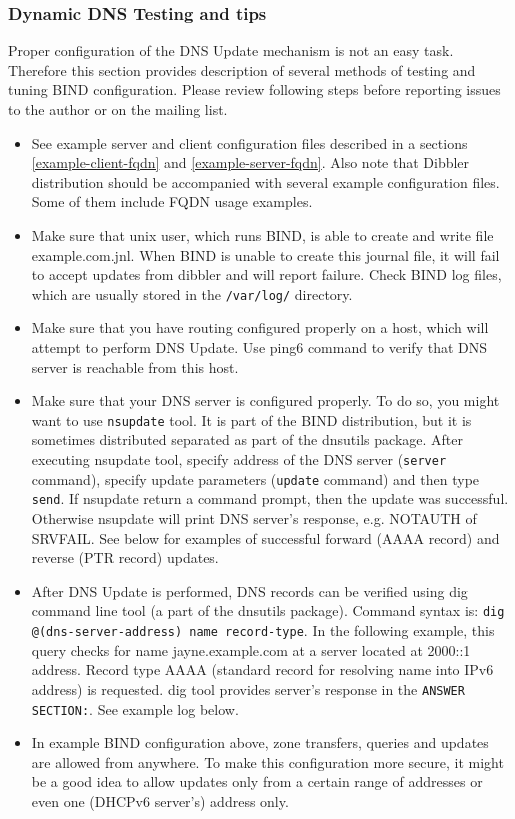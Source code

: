 \subsubsection{Dynamic DNS Testing and tips}
Proper configuration of the DNS Update mechanism is not an easy
task. Therefore this section provides description of several methods of
testing and tuning BIND configuration. Please review following steps
before reporting issues to the author or on the mailing list.

\begin{itemize}
\item See example server and client configuration files described in a
      sections \ref{example-client-fqdn} and \ref{example-server-fqdn}. Also
      note that Dibbler distribution should be accompanied with several
      example configuration files. Some of them include FQDN usage examples.
\item Make sure that unix user, which runs BIND, is able to create and
      write file example.com.jnl. When BIND is unable to create this
      journal file, it will fail to accept updates from dibbler and will
      report failure. Check BIND log files, which are usually stored in the
      \verb+/var/log/+ directory.
\item Make sure that you have routing configured properly on a host,
      which will attempt to perform DNS Update. Use ping6 command to
      verify that DNS server is reachable from this host.
\item Make sure that your DNS server is configured properly. To do so,
      you might want to use \verb+nsupdate+ tool. It is part of the BIND
      distribution, but it is sometimes distributed separated as part of
      the dnsutils package. After executing nsupdate tool, specify
      address of the DNS server (\verb+server+ command), specify update
      parameters (\verb+update+ command) and then type \verb+send+. If
      nsupdate return a command prompt, then the update was
      successful. Otherwise nsupdate will print DNS server's response,
      e.g. NOTAUTH of SRVFAIL. See below for examples of successful
      forward (AAAA record) and reverse (PTR record) updates.
\item After DNS Update is performed, DNS records can be verified using
      dig command line tool (a part of the dnsutils package). Command
      syntax is: 
      \verb+dig @(dns-server-address) name record-type+. 
      In the following example, this query checks for name
      jayne.example.com at a server located at 2000::1 address. Record
      type AAAA (standard record for resolving name into IPv6 address)
      is requested. dig tool provides server's response in the
      \verb+ANSWER SECTION:+. See example log below.
\item In example BIND configuration above, zone transfers, queries and
      updates are allowed from anywhere. To make this configuration more
      secure, it might be a good idea to allow updates only from a
      certain range of addresses or even one (DHCPv6 server's) address
      only.
\end{itemize}


